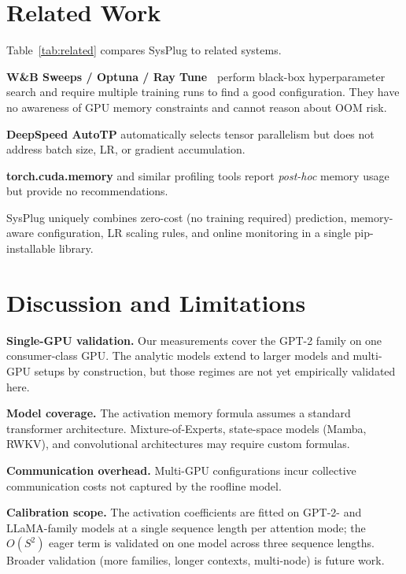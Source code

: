\documentclass[10pt,twocolumn]{article}
\begin{document}
\section{Related Work}

Table~\ref{tab:related} compares SysPlug to related systems.



\textbf{W\&B Sweeps / Optuna / Ray Tune~\cite{liaw2018tune,wandb2020}} perform
black-box hyperparameter search and require multiple training runs to find a
good configuration.  They have no awareness of GPU memory constraints and
cannot reason about OOM risk.

\textbf{DeepSpeed AutoTP} automatically selects tensor parallelism but does
not address batch size, LR, or gradient accumulation.

\textbf{torch.cuda.memory} and similar profiling tools report \emph{post-hoc}
memory usage but provide no recommendations.

SysPlug uniquely combines zero-cost (no training required) prediction,
memory-aware configuration, LR scaling rules, and online monitoring in a
single pip-installable library.

\section{Discussion and Limitations}
\label{sec:limitations}

\textbf{Single-GPU validation.}  Our measurements cover the GPT-2 family on one
consumer-class GPU. The analytic models extend to larger models and multi-GPU
setups by construction, but those regimes are not yet empirically validated
here.

\textbf{Model coverage.}  The activation memory formula assumes a standard
transformer architecture.  Mixture-of-Experts, state-space models (Mamba,
RWKV), and convolutional architectures may require custom formulas.

\textbf{Communication overhead.}  Multi-GPU configurations incur
collective communication costs not captured by the roofline model.

\textbf{Calibration scope.}  The activation coefficients are fitted on GPT-2-
and LLaMA-family models at a single sequence length per attention mode; the
$O(S^2)$ eager term is validated on one model across three sequence lengths.
Broader validation (more families, longer contexts, multi-node) is future work.
\end{document}
